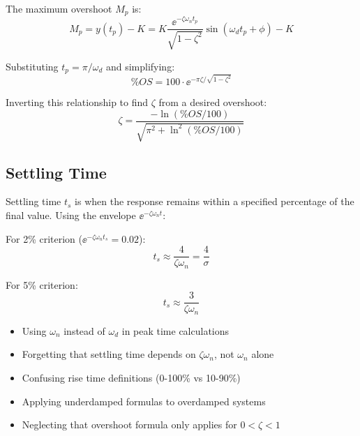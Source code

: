 The maximum overshoot $M_p$ is:
\begin{equation}
M_p = y(t_p) - K = K\frac{\ee^{-\zeta\omega_n t_p}}{\sqrt{1-\zeta^2}}\sin(\omega_d t_p + \phi) - K
\end{equation}

Substituting $t_p = \pi/\omega_d$ and simplifying:
\begin{equation}
\boxed{\%OS = 100 \cdot \ee^{-\pi\zeta/\sqrt{1-\zeta^2}}}
\label{eq:overshoot}
\end{equation}

Inverting this relationship to find $\zeta$ from a desired overshoot:
\begin{equation}
\boxed{\zeta = \frac{-\ln(\%OS/100)}{\sqrt{\pi^2 + \ln^2(\%OS/100)}}}
\label{eq:zeta_from_os}
\end{equation}

\subsection{Settling Time}

Settling time $t_s$ is when the response remains within a specified percentage of the final value. Using the envelope $\ee^{-\zeta\omega_n t}$:

For 2\% criterion ($\ee^{-\zeta\omega_n t_s} = 0.02$):
\begin{equation}
\boxed{t_s \approx \frac{4}{\zeta\omega_n} = \frac{4}{\sigma}}
\label{eq:settling_2pct}
\end{equation}

For 5\% criterion:
\begin{equation}
t_s \approx \frac{3}{\zeta\omega_n}
\end{equation}

\begin{warningbox}[title=Common Mistakes in Time-Domain Calculations]
\begin{itemize}
    \item Using $\omega_n$ instead of $\omega_d$ in peak time calculations
    \item Forgetting that settling time depends on $\zeta\omega_n$, not $\omega_n$ alone
    \item Confusing rise time definitions (0-100\% vs 10-90\%)
    \item Applying underdamped formulas to overdamped systems
    \item Neglecting that overshoot formula only applies for $0 < \zeta < 1$
\end{itemize}
\end{warningbox}

